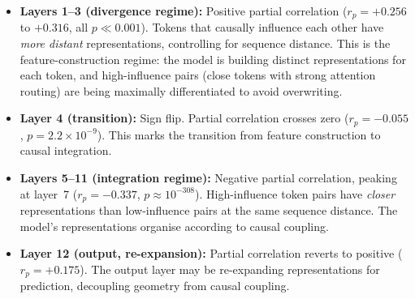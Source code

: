 \documentclass[11pt,a4paper]{article}
\begin{document}
\begin{itemize}
\item \textbf{Layers 1--3 (divergence regime):}
  Positive partial correlation ($r_p = +0.256$ to $+0.316$, all $p \ll 0.001$).
  Tokens that causally influence each other have \emph{more distant}
  representations, controlling for sequence distance.
  This is the feature-construction regime: the model is building
  distinct representations for each token, and high-influence pairs
  (close tokens with strong attention routing) are being maximally
  differentiated to avoid overwriting.

\item \textbf{Layer 4 (transition):}
  Sign flip. Partial correlation crosses zero ($r_p = -0.055$, $p = 2.2 \times 10^{-9}$).
  This marks the transition from feature construction to causal integration.

\item \textbf{Layers 5--11 (integration regime):}
  Negative partial correlation, peaking at layer~7 ($r_p = -0.337$, $p \approx 10^{-308}$).
  High-influence token pairs have \emph{closer} representations than low-influence pairs
  at the same sequence distance.
  The model's representations organise according to causal coupling.

\item \textbf{Layer 12 (output, re-expansion):}
  Partial correlation reverts to positive ($r_p = +0.175$).
  The output layer may be re-expanding representations for prediction,
  decoupling geometry from causal coupling.
\end{itemize}
\end{document}
